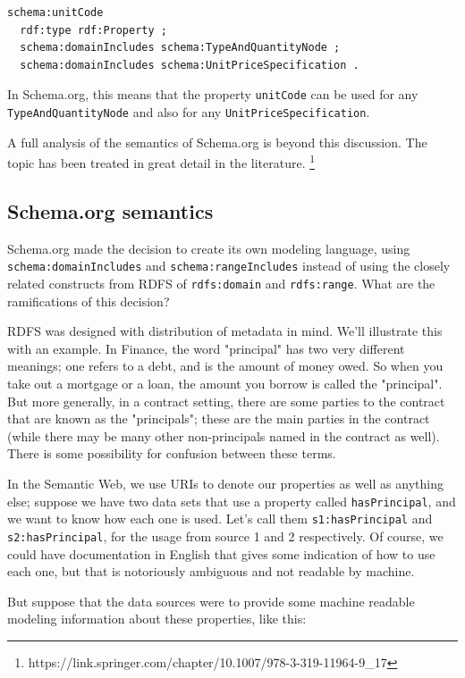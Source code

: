 \begin{lstlisting}
schema:unitCode
  rdf:type rdf:Property ;
  schema:domainIncludes schema:TypeAndQuantityNode ;
  schema:domainIncludes schema:UnitPriceSpecification .
\end{lstlisting}

In Schema.org, this means that the property \texttt{unitCode} can be used for any 
\texttt{TypeAndQuantityNode} and also for any \texttt{UnitPriceSpecification}.

A full analysis of the semantics of Schema.org is beyond this discussion.  The topic has been treated in 
great detail in the literature. \footnote{https://link.springer.com/chapter/10.1007/978-3-319-11964-9\_17}

\subsection{Schema.org semantics}

Schema.org made the decision to create its own modeling language, using \texttt{schema:domainIncludes} and 
\texttt{schema:rangeIncludes} instead of using the closely related constructs from RDFS of \texttt{rdfs:domain} 
and \texttt{rdfs:range}.  What are the ramifications of this decision? 

RDFS was designed with distribution of metadata in mind.  We'll illustrate this with an example.  In Finance, the 
word "principal" has two very different meanings; one refers to a debt, and is the amount of money owed.  
So when you take out a mortgage or a loan, the amount you borrow is called the "principal".  But more
generally, in a contract setting, there are some parties to the contract that are known as the "principals";
these are the main parties in the contract (while there may be many other non-principals named in the contract
as well).  There is some possibility for confusion between these terms.  

In the Semantic Web, we use URIs to denote our properties as well as anything else; suppose we have two data sets 
that use a property called \texttt{hasPrincipal}, and we want to know how each one is used.  Let's call them
\texttt{s1:hasPrincipal} and \texttt{s2:hasPrincipal}, for the usage from source 1 and 2 respectively.   Of course, 
we could have documentation in English that gives some indication of how to use each one, but that is notoriously
ambiguous and not readable by machine.  

But suppose that the data sources were to provide some machine readable modeling information about these properties, 
like this:

